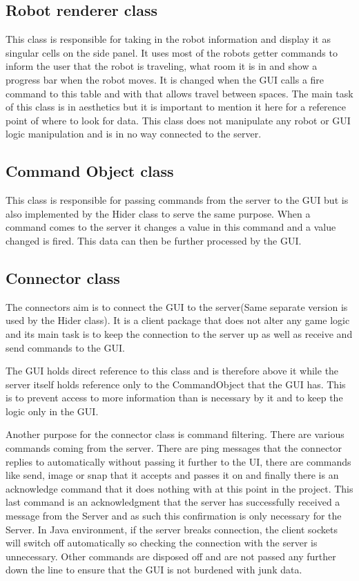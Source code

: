     \subsection{Robot renderer class}
      This class is responsible for taking in the robot information and display it as singular cells on the side panel. It uses most of the robots getter commands to inform the user that the robot is traveling, what room it is in and show a progress bar when the robot moves. It is changed when the GUI calls a fire command to this table and with that allows travel between spaces. The main task of this class is in aesthetics but it is important to mention it here for a reference point of where to look for data. This class does not manipulate any robot or GUI logic manipulation and is in no way connected to the server.

    \subsection{Command Object class}
      This class is responsible for passing commands from the server to the GUI but is also implemented by the Hider class to serve the same purpose. When a command comes to the server it changes a value in this command and a value changed is fired. This data can then be further processed by the GUI.

    \subsection{Connector class}
      The connectors aim is to connect the GUI to the server(Same separate version is used by the Hider class). It is a client package that does not alter any game logic and its main task is to keep the connection to the server up as well as receive and send commands to the GUI.

      The GUI holds direct reference to this class and is therefore above it while the server itself holds reference only to the CommandObject that the GUI has. This is to prevent access to more information than is necessary by it and to keep the logic only in the GUI.

      Another purpose for the connector class is command filtering. There are various commands coming from the server. There are ping messages that the connector replies to automatically without passing it further to the UI, there are commands like send, image or snap that it accepts and passes it on and finally there is an acknowledge command that it does nothing with at this point in the project. This last command is an acknowledgment that the server has successfully received a message from the Server and as such this confirmation is only necessary for the Server. In Java environment, if the server breaks connection, the client sockets will switch off automatically so checking the connection with the server is unnecessary. Other commands are disposed off and are not passed any further down the line to ensure that the GUI is not burdened with junk data.

